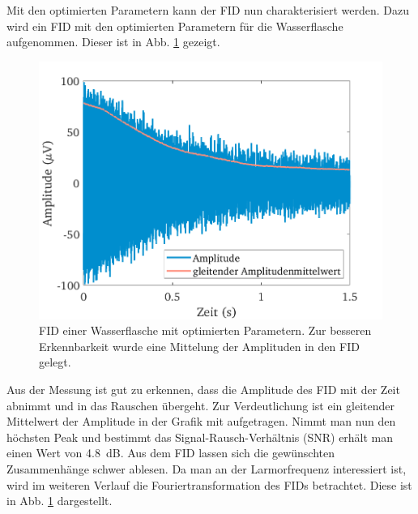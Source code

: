 \documentclass[../main.tex]{subfiles}
\begin{document}
    Mit den optimierten Parametern kann der FID nun charakterisiert werden. Dazu wird ein FID mit den optimierten Parametern für die Wasserflasche aufgenommen. Dieser ist in Abb. \ref{fig:FID_Optimised} gezeigt.
    \begin{figure}[H]
        \centering
        \includegraphics[width=\textwidth]{Bilddateien/7/Part7_Fig_1.png}
        \caption{FID einer Wasserflasche mit optimierten Parametern. Zur besseren Erkennbarkeit wurde eine Mittelung der Amplituden in den FID gelegt.}
        \label{fig:FID_Optimised}
    \end{figure}
    Aus der Messung ist gut zu erkennen, dass die Amplitude des FID mit der Zeit abnimmt und in das Rauschen übergeht. Zur Verdeutlichung ist ein gleitender Mittelwert der Amplitude in der Grafik mit aufgetragen. Nimmt man nun den höchsten Peak und bestimmt das Signal-Rausch-Verhältnis (SNR) erhält man einen Wert von \SI{4,8}{\deci \bel}. Aus dem FID lassen sich die gewünschten Zusammenhänge schwer ablesen. Da man an der Larmorfrequenz interessiert ist, wird im weiteren Verlauf die Fouriertransformation des FIDs betrachtet. Diese ist in Abb. \ref{fig:FID_Optimised} dargestellt.
\end{document}
